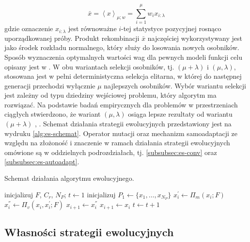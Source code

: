     \begin{equation}
        \bar{x} = \left<x\right>_{\mu; w} = \sum^{\mu}_{i = 1} w_{i}x_{i:\lambda}
    \end{equation}
    gdzie oznaczenie $x_{i:\lambda}$ jest równoważne $i$-tej statystyce pozycyjnej rosnąco uporządkowanej próby. Produkt rekombinacji $\bar{x}$ najczęściej wykorzystywany jest jako środek rozkładu normalnego, który służy do losowania nowych osobników. Sposób wyznaczenia optymalnych wartości wag dla pewnych modeli funkcji celu opisany jest w \cite{Chun:2018}.
    W obu wariantach selekcji osobników, tj. $(\mu + \lambda)$ i $(\mu, \lambda)$, stosowana jest w pełni deterministyczna selekcja elitarna, w której do następnej generacji przechodzi wyłącznie $\mu$ najlepszych osobników.  Wybór wariantu selekcji jest zależny od typu dziedziny wejściowej problemu, który algorytm ma rozwiązać. Na podstawie badań empirycznych dla problemów w przestrzeniach ciągłych stwierdzono, że wariant $(\mu, \lambda)$ osiąga lepsze rezultaty od wariantu  $(\mu + \lambda)$ \cite{Beyer:1992}, \cite{Schwefel:1987}. Schemat działania strategii ewolucyjnych przedstawiony jest na wydruku \ref{alg:es-schemat}. Operator mutacji oraz mechanizm samoadaptacji ze względu na złożoność i znaczenie w ramach działania strategii ewolucyjnych omówione są w oddzielnych podrozdziałach, tj. \ref{subsubsec:es-conv} oraz \ref{subsubsec:es-autoadapt}.
    \begin{algorithm}[h]
    \caption{Schemat działania algorytmu ewolucyjnego.}
    \label{alg:es-schemat}
    \begin{algorithmic}[1]
        \STATE inicjalizuj $F$, $C_r$, $N_{P}$;
        \STATE $t \gets 1$
        \STATE inicjalizuj $P_1 \gets \{x_{1}, \dots, x_{N_{P}}\}$
                \STATE $x^{'}_{i} \gets \Pi_{m}\left( x_{i}; F\right )$
                \STATE $x^{''}_{i} \gets \Pi_{v}\left( x_{i}, x^{'}_{i}; F\right )$
                    \STATE $x_{i+1} \gets x^{''}_{i} $
                \ELSE
                    \STATE $x_{i+1} \gets x_{i} $
                \ENDIF
            \ENDFOR
            $t \gets t + 1$
        \ENDWHILE
    \end{algorithmic}
    \end{algorithm}
    
\subsection{Własności strategii ewolucyjnych}
\label{subsubsec:es-op-mut}
